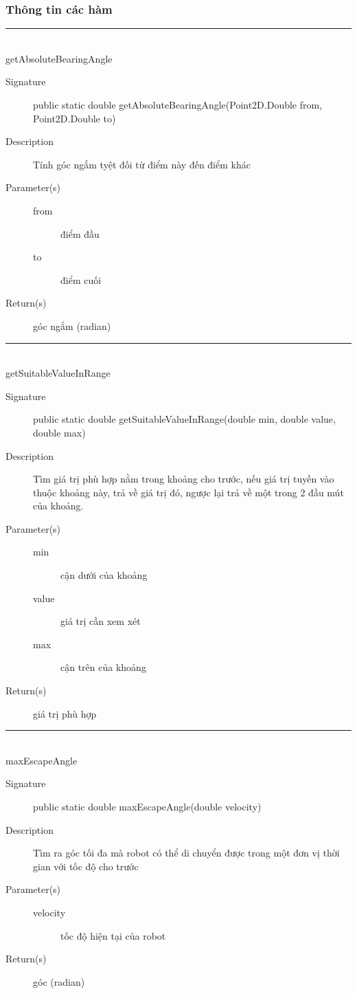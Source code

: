 \documentclass[14pt]{article}
\newcommand{\sep}{\rule{\textwidth}{0.007pt}\\}
\begin{document}
\subsubsection{Thông tin các hàm}
\sep
getAbsoluteBearingAngle
\begin{description}
	\item[Signature]public static double getAbsoluteBearingAngle(Point2D.Double from,
			Point2D.Double to)
	\item[Description] Tính góc ngắm tyệt đối từ điểm này đến điểm khác
	\item[Parameter(s)]
	\begin{description}
		\item[from] điểm đầu
		\item[to] điểm cuối
	\end{description}
	\item[Return(s)] góc ngắm (radian)
\end{description}
\sep
getSuitableValueInRange
\begin{description}
	\item[Signature]public static double getSuitableValueInRange(double min, double value,
			double max)
	\item[Description] Tìm giá trị phù hợp nằm trong khoảng cho trước, nếu giá trị tuyền vào thuộc khoảng này, trả về giá trị đó, ngược lại trả về một trong 2 đầu mút của khoảng.
	\item[Parameter(s)]
	\begin{description}
		\item[min] cận dưới của khoảng
		\item[value] giá trị cần xem xét
		\item[max] cận trên của khoảng
	\end{description}
	\item[Return(s)] giá trị phù hợp
\end{description}
\sep
maxEscapeAngle
\begin{description}
	\item[Signature]public static double maxEscapeAngle(double velocity)
	\item[Description] Tìm ra góc tối đa mà robot có thể di chuyển được trong một đơn vị thời gian với tốc độ cho trước
	\item[Parameter(s)]
	\begin{description}
		\item[velocity] tốc độ hiện tại của robot
	\end{description}
	\item[Return(s)] góc (radian)
\end{description}
\end{document}
